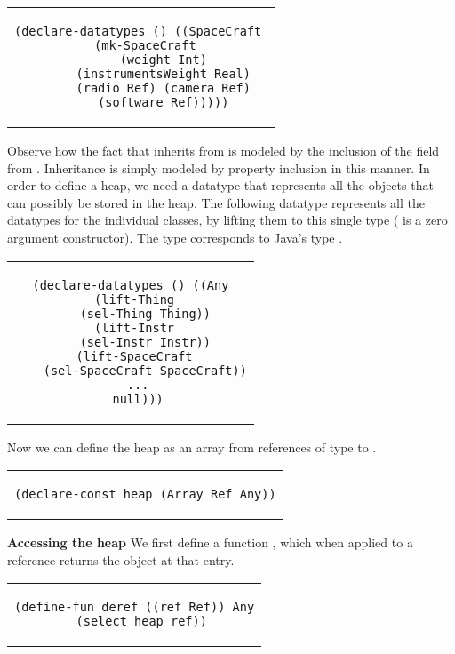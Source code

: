 \begin{center}
\begin{tabular}{c}
\small
\begin{lstlisting}  
(declare-datatypes () ((SpaceCraft 
  (mk-SpaceCraft 
      (weight Int)
      (instrumentsWeight Real)
      (radio Ref) (camera Ref)
      (software Ref)))))
\end{lstlisting}
\end{tabular}
\end{center}

\noindent Observe how the fact that  inherits from
 is modeled by the inclusion of the  field
from . Inheritance is simply modeled by property
inclusion in this manner.  In order to define a heap, we need a
datatype that represents all the objects that can possibly be stored
in the heap. The following datatype  represents all the
datatypes for the individual classes, by lifting them to this single
type ( is a zero argument constructor). The type 
corresponds to Java's type .

\begin{center}
\begin{tabular}{c}
\small
\begin{lstlisting}
(declare-datatypes () ((Any
  (lift-Thing 
    (sel-Thing Thing))
  (lift-Instr 
    (sel-Instr Instr))
  (lift-SpaceCraft 
    (sel-SpaceCraft SpaceCraft))
  ...
  null)))
\end{lstlisting}
\end{tabular}
\end{center}

\noindent Now we can define the heap as an array from references of
type  to .

\begin{center}
\begin{tabular}{c}
\small
\begin{lstlisting}
(declare-const heap (Array Ref Any))
\end{lstlisting}
\end{tabular}
\end{center}

\textbf{Accessing the heap} We first define a function ,
which when applied to a reference returns the  object at
that entry.

\begin{center}
\begin{tabular}{c}
\small
\begin{lstlisting}
(define-fun deref ((ref Ref)) Any
  (select heap ref))
\end{lstlisting}
\end{tabular}
\end{center}

